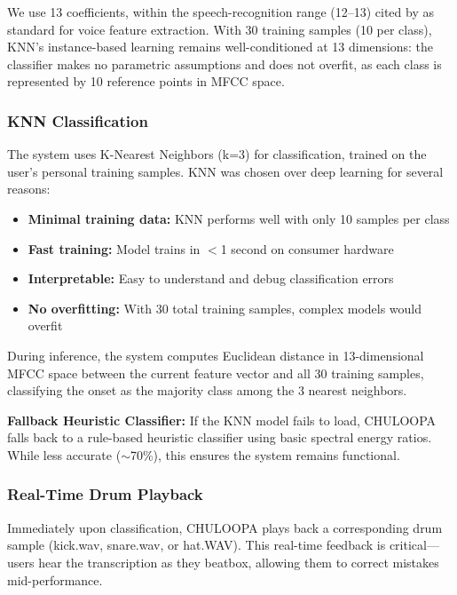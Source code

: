 \documentclass{aimc2026}
\begin{document}
We use 13 coefficients, within the speech-recognition range (12--13) cited by \citet{martanto2025beatbox} as standard for voice feature extraction. With 30 training samples (10 per class), KNN's instance-based learning remains well-conditioned at 13 dimensions: the classifier makes no parametric assumptions and does not overfit, as each class is represented by 10 reference points in MFCC space.

\subsubsection{KNN Classification}

The system uses K-Nearest Neighbors (k=3) for classification, trained on the user's personal training samples. KNN was chosen over deep learning for several reasons:

\begin{itemize}
\item \textbf{Minimal training data:} KNN performs well with only 10 samples per class
\item \textbf{Fast training:} Model trains in $<$1 second on consumer hardware
\item \textbf{Interpretable:} Easy to understand and debug classification errors
\item \textbf{No overfitting:} With 30 total training samples, complex models would overfit
\end{itemize}

During inference, the system computes Euclidean distance in 13-dimensional MFCC space between the current feature vector and all 30 training samples, classifying the onset as the majority class among the 3 nearest neighbors.

\textbf{Fallback Heuristic Classifier:} If the KNN model fails to load, CHULOOPA falls back to a rule-based heuristic classifier using basic spectral energy ratios. While less accurate ($\sim$70\%), this ensures the system remains functional.

\subsubsection{Real-Time Drum Playback}

Immediately upon classification, CHULOOPA plays back a corresponding drum sample (kick.wav, snare.wav, or hat.WAV). This real-time feedback is critical---users hear the transcription as they beatbox, allowing them to correct mistakes mid-performance.
\end{document}
